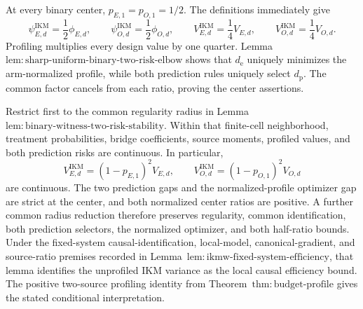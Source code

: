 At every binary center, \(p_{E,1}=p_{O,1}=1/2\).  The definitions immediately give
\[
 \psi_{E,d}^{\mathrm{IKM}}=\frac12\phi_{E,d},
 \qquad \psi_{O,d}^{\mathrm{IKM}}=\frac12\phi_{O,d},
 \qquad V_{E,d}^{\mathrm{IKM}}=\frac14V_{E,d},
 \qquad V_{O,d}^{\mathrm{IKM}}=\frac14V_{O,d}.                               \tag{1}
\]
Profiling multiplies every design value by one quarter.  Lemma~\(\mathrm{lem{:}sharp\text{-}uniform\text{-}binary\text{-}two\text{-}risk\text{-}elbow}\) shows that \(d_{\mathrm e}\) uniquely minimizes the arm-normalized profile, while both prediction rules uniquely select \(d_{\mathrm p}\).  The common factor cancels from each ratio, proving the center assertions.

Restrict first to the common regularity radius in Lemma~\(\mathrm{lem{:}binary\text{-}witness\text{-}two\text{-}risk\text{-}stability}\).  Within that finite-cell neighborhood, treatment probabilities, bridge coefficients, source moments, profiled values, and both prediction risks are continuous.  In particular,
\[
 V_{E,d}^{\mathrm{IKM}}=(1-p_{E,1})^2V_{E,d},
 \qquad V_{O,d}^{\mathrm{IKM}}=(1-p_{O,1})^2V_{O,d}
\]
are continuous.  The two prediction gaps and the normalized-profile optimizer gap are strict at the center, and both normalized center ratios are positive.  A further common radius reduction therefore preserves regularity, common identification, both prediction selectors, the normalized optimizer, and both half-ratio bounds.  Under the fixed-system causal-identification, local-model, canonical-gradient, and source-ratio premises recorded in Lemma~\(\mathrm{lem{:}ikmw\text{-}fixed\text{-}system\text{-}efficiency}\), that lemma identifies the unprofiled IKM variance as the local causal efficiency bound.  The positive two-source profiling identity from Theorem~\(\mathrm{thm{:}budget\text{-}profile}\) gives the stated conditional interpretation.